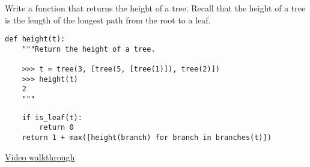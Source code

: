 \question
Write a function that returns the height of a tree.
Recall that the height of a tree is the length of the longest path from
the root to a leaf.
\begin{lstlisting}
def height(t):
    """Return the height of a tree.

    >>> t = tree(3, [tree(5, [tree(1)]), tree(2)])
    >>> height(t)
    2
    """
\end{lstlisting}
\begin{solution}[1in]
\begin{lstlisting}
    if is_leaf(t):
        return 0
    return 1 + max([height(branch) for branch in branches(t)])
\end{lstlisting}
\href{https://www.youtube.com/watch?v=cZWnevsmb5o&index=2&list=PLx38hZJ5RLZcgrSJp16YmzNwn9hL5JD8q&t=1m45s}{Video walkthrough}
\end{solution}
